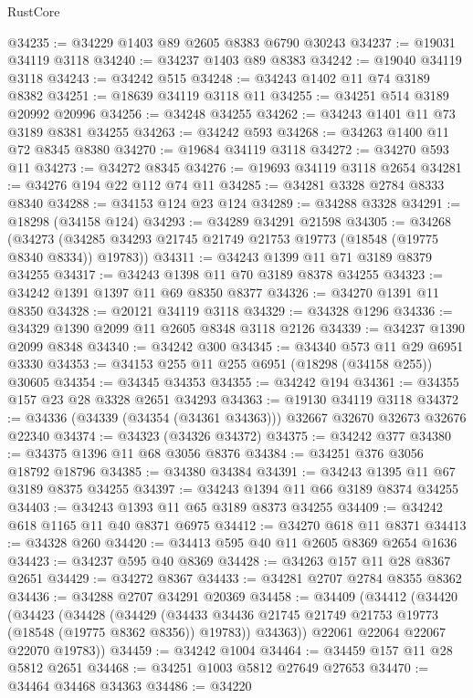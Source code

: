 \begin{lexlean}{RustCore}
\begin{coremodule}
@34235 := @34229 @1403 @89 @2605 @8383 @6790 @30243
@34237 := @19031 @34119 @3118
@34240 := @34237 @1403 @89 @8383
@34242 := @19040 @34119 @3118
@34243 := @34242 @515
@34248 := @34243 @1402 @11 @74 @3189 @8382
@34251 := @18639 @34119 @3118 @11
@34255 := @34251 @514 @3189 @20992 @20996
@34256 := @34248 @34255
@34262 := @34243 @1401 @11 @73 @3189 @8381 @34255
@34263 := @34242 @593
@34268 := @34263 @1400 @11 @72 @8345 @8380
@34270 := @19684 @34119 @3118
@34272 := @34270 @593 @11
@34273 := @34272 @8345
@34276 := @19693 @34119 @3118 @2654
@34281 := @34276 @194 @22 @112 @74 @11
@34285 := @34281 @3328 @2784 @8333 @8340
@34288 := @34153 @124 @23 @124
@34289 := @34288 @3328
@34291 := @18298 (@34158 @124)
@34293 := @34289 @34291 @21598
@34305 := @34268
    (@34273 (@34285 @34293 @21745 @21749 @21753 @19773 (@18548 (@19775 @8340 @8334)) @19783))
@34311 := @34243 @1399 @11 @71 @3189 @8379 @34255
@34317 := @34243 @1398 @11 @70 @3189 @8378 @34255
@34323 := @34242 @1391 @1397 @11 @69 @8350 @8377
@34326 := @34270 @1391 @11 @8350
@34328 := @20121 @34119 @3118
@34329 := @34328 @1296
@34336 := @34329 @1390 @2099 @11 @2605 @8348 @3118 @2126
@34339 := @34237 @1390 @2099 @8348
@34340 := @34242 @300
@34345 := @34340 @573 @11 @29 @6951 @3330
@34353 := @34153 @255 @11 @255 @6951 (@18298 (@34158 @255)) @30605
@34354 := @34345 @34353
@34355 := @34242 @194
@34361 := @34355 @157 @23 @28 @3328 @2651 @34293
@34363 := @19130 @34119 @3118
@34372 := @34336 (@34339 (@34354 (@34361 @34363))) @32667 @32670 @32673 @32676 @22340
@34374 := @34323 (@34326 @34372)
@34375 := @34242 @377
@34380 := @34375 @1396 @11 @68 @3056 @8376
@34384 := @34251 @376 @3056 @18792 @18796
@34385 := @34380 @34384
@34391 := @34243 @1395 @11 @67 @3189 @8375 @34255
@34397 := @34243 @1394 @11 @66 @3189 @8374 @34255
@34403 := @34243 @1393 @11 @65 @3189 @8373 @34255
@34409 := @34242 @618 @1165 @11 @40 @8371 @6975
@34412 := @34270 @618 @11 @8371
@34413 := @34328 @260
@34420 := @34413 @595 @40 @11 @2605 @8369 @2654 @1636
@34423 := @34237 @595 @40 @8369
@34428 := @34263 @157 @11 @28 @8367 @2651
@34429 := @34272 @8367
@34433 := @34281 @2707 @2784 @8355 @8362
@34436 := @34288 @2707 @34291 @20369
@34458 := @34409
    (@34412
      (@34420
        (@34423
          (@34428
            (@34429
              (@34433 @34436 @21745 @21749 @21753 @19773 (@18548 (@19775 @8362 @8356)) @19783))
            @34363))
        @22061
        @22064
        @22067
        @22070
        @19783))
@34459 := @34242 @1004
@34464 := @34459 @157 @11 @28 @5812 @2651
@34468 := @34251 @1003 @5812 @27649 @27653
@34470 := @34464 @34468 @34363
@34486 := @34220

\end{coremodule}
\end{lexlean}
